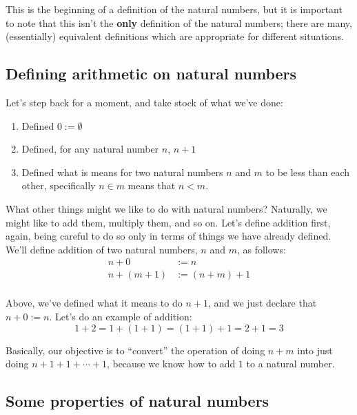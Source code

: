 This is the beginning of a definition of the natural numbers, but it is important to note that this isn't the \textbf{only} definition of the natural numbers; there are many, (essentially) equivalent definitions which are appropriate for different situations.

\subsection{Defining arithmetic on natural numbers}

Let's step back for a moment, and take stock of what we've done:

\begin{enumerate}
    \item Defined $0 := \emptyset$
    \item Defined, for any natural number $n$, $n + 1$
    \item Defined what is means for two natural numbers $n$ and $m$ to be less than each other, specifically $n \in m$ means that $n < m$.
\end{enumerate}

What other things might we like to do with natural numbers?
Naturally, we might like to add them, multiply them, and so on.
Let's define addition first, again, being careful to do so only in terms of things we have already defined.
We'll define addition of two natural numbers, $n$ and $m$, as follows:
\begin{align*}
    n + 0 &:= n \\
    n + (m + 1) &:= (n + m) + 1 \\
\end{align*}

Above, we've defined what it means to do $n + 1$, and we just declare that $n + 0 := n$.
Let's do an example of addition:
\[
    1 + 2 = 1 + (1 + 1) = (1 + 1) + 1 = 2 + 1 = 3
\]

Basically, our objective is to ``convert'' the operation of doing $n + m$ into just doing $n + 1 + 1 + \cdots + 1$, because we know how to add $1$ to a natural number.


\subsection{Some properties of natural numbers}


